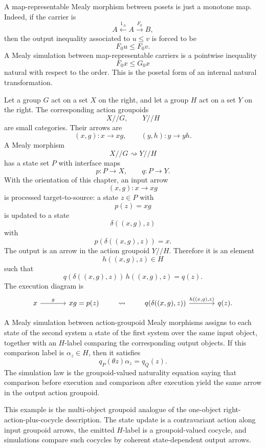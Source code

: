 \begin{example}
    A map-representable Mealy morphism between posets is just a monotone map. Indeed, if the carrier is
    \[
        A\xleftarrow{1_A}A\xrightarrow{F_0}B,
    \]
    then the output inequality associated to \(u\leq v\) is forced to be
    \[
        F_0u\leq F_0v.
    \]
    A Mealy simulation between map-representable carriers is a pointwise inequality
    \[
        F_0x\leq G_0x
    \]
    natural with respect to the order. This is the posetal form of an internal natural transformation.
\end{example}

\begin{example}
\label{example:action-groupoids} 
Let a group \(G\) act on a set \(X\) on the right, and let a group \(H\) act on
a set \(Y\) on the right. The corresponding action groupoids
\[
    X/\!/G,
    \qquad
    Y/\!/H
\]
are small categories. Their arrows are
\[
    (x,g):x\to xg,
    \qquad
    (y,h):y\to yh.
\]
A Mealy morphism
\[
    X/\!/G\rightsquigarrow Y/\!/H
\]
has a state set \(P\) with interface maps
\[
    p:P\to X,
    \qquad
    q:P\to Y.
\]
With the orientation of this chapter, an input arrow
\[
    (x,g):x\to xg
\]
is processed target-to-source: a state \(z\in P\) with
\[
    p(z)=xg
\]
is updated to a state
\[
    \delta((x,g),z)
\]
with
\[
    p(\delta((x,g),z))=x.
\]
The output is an arrow in the action groupoid \(Y/\!/H\). Therefore it is an
element
\[
    h((x,g),z)\in H
\]
such that
\[
    q(\delta((x,g),z))\,h((x,g),z)=q(z).
\]
The execution diagram is
\[
    \begin{tikzcd}[column sep=large]
        x
            \arrow[r, "{g}"]
        &
        xg=p(z)
    \end{tikzcd}
    \qquad\leadsto\qquad
    \begin{tikzcd}[column sep=large]
        q(\delta((x,g),z))
            \arrow[r, "{h((x,g),z)}"]
        &
        q(z).
    \end{tikzcd}
\]

A Mealy simulation between action-groupoid Mealy morphisms assigns to each
state of the second system a state of the first system over the same input
object, together with an \(H\)-label comparing the corresponding output
objects. If this comparison label is \(\alpha_z\in H\), then it satisfies
\[
    q_P(\theta z)\alpha_z=q_Q(z).
\]
The simulation law is the groupoid-valued naturality equation saying that
comparison before execution and comparison after execution yield the same arrow
in the output action groupoid.

This example is the multi-object groupoid analogue of the one-object
right-action-plus-cocycle description. The state update is a contravariant
action along input groupoid arrows, the emitted \(H\)-label is a
groupoid-valued cocycle, and simulations compare such cocycles by coherent
state-dependent output arrows.
\end{example}


